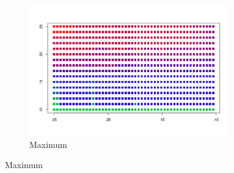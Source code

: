 \documentclass{article}
\begin{document}
\begin{figure}[!htb]
\begin{subfigure}{0.49\textwidth}
 \end{subfigure}
 \begin{subfigure}{0.49\textwidth}
  \caption{Maximum}
  \includegraphics[width=0.95\textwidth]{elegant-gl/datasets/colors_max}
 \end{subfigure}
\end{figure}
\FloatBarrier
\end{document}
